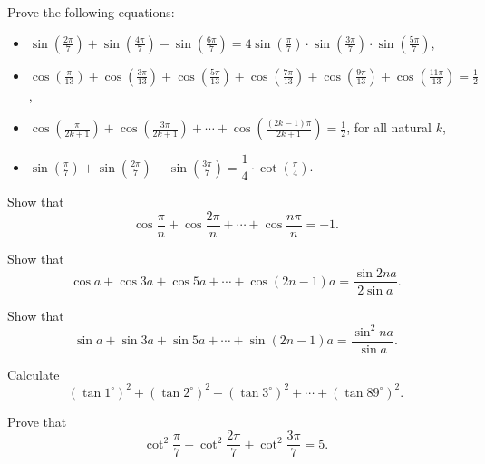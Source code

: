 \begin{question} Prove the following equations:

\begin{itemize}

\item $\sin \left(\frac{2\pi}{7}\right)+\sin \left(\frac{4\pi}{7}\right) - \sin \left(\frac{6\pi}{7}\right)= 4 \sin \left(\frac{\pi}{7}\right) \cdot \sin \left(\frac{3\pi}{7}\right) \cdot \sin \left(\frac{5\pi}{7}\right)$,

\item $\cos \left(\frac{\pi}{13}\right)+\cos \left(\frac{3\pi}{13}\right)+\cos \left(\frac{5\pi}{13}\right)+\cos \left(\frac{7\pi}{13}\right)+\cos \left(\frac{9\pi}{13}\right)+\cos \left(\frac{11\pi}{13}\right)=\frac12$,

\item $\cos \left(\frac{\pi}{2k+1}\right)+\cos \left(\frac{3\pi}{2k+1}\right)+\cdots +\cos \left(\frac{(2k-1)\pi}{2k+1}\right)=\frac12$, for all natural $k$,

\item $\sin \left(\frac{\pi}{7}\right)+\sin \left(\frac{2\pi}{7}\right)+\sin \left(\frac{3\pi}{7}\right)=\dfrac 14 \cdot \cot \left(\frac{\pi}{4}\right)$.
\end{itemize}
\end{question}



\begin{question} Show that
\[\cos \frac{\pi}{n}  + \cos \frac{2 \pi}{n}+ \cdots + \cos \frac{n \pi}{n} = -1.\]
\end{question}



\begin{question}Show that $$\cos a + \cos 3a + \cos 5a + \cdots + \cos(2n - 1)a = \frac{\sin 2na}{2 \sin a}.$$
\end{question}


\begin{question} Show that $$\sin a + \sin 3a + \sin 5a + \cdots + \sin(2n- 1)a = \frac{\sin^2 na}{\sin a}.$$
\end{question}



\begin{question} Calculate
\[(\tan1^\circ)^2+(\tan2^\circ)^2+(\tan3^\circ)^2+\cdots+(\tan89^\circ)^2.\]
\end{question}



\begin{question} Prove that $$\cot^2 \frac{\pi}{7}+\cot^2 \frac{2\pi}{7}+\cot^2 \frac{3\pi}{7}=5.$$
\end{question}


